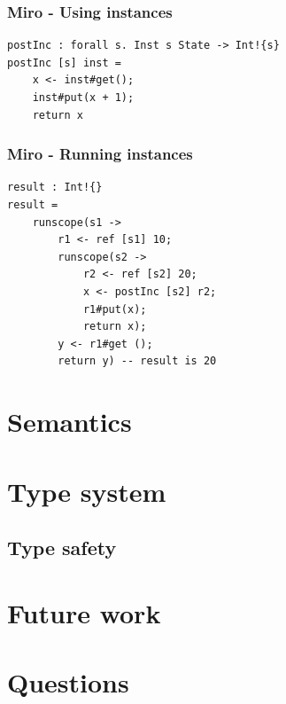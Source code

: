 \documentclass{beamer}
\begin{document}
\begin{frame}[fragile]\frametitle{Miro - Using instances}
\begin{example}
\begin{verbatim}
postInc : forall s. Inst s State -> Int!{s}
postInc [s] inst =
	x <- inst#get();
	inst#put(x + 1);
	return x
\end{verbatim}
\end{example}
\end{frame}

\begin{frame}[fragile]\frametitle{Miro - Running instances}
\begin{example}
\begin{verbatim}
result : Int!{}
result =
	runscope(s1 ->
		r1 <- ref [s1] 10;
		runscope(s2 ->
			r2 <- ref [s2] 20;
			x <- postInc [s2] r2;
			r1#put(x);
			return x);
		y <- r1#get ();
		return y) -- result is 20
\end{verbatim}
\end{example}
\end{frame}

\section{Semantics}

\section{Type system}

\subsection{Type safety}

\section{Future work}

\section{Questions}
\end{document}
